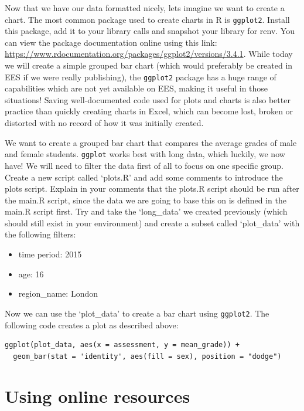 \documentclass[
  12pt,
]{article}
\providecommand{\tightlist}{%
  \setlength{\itemsep}{0pt}\setlength{\parskip}{0pt}}
\begin{document}
Now that we have our data formatted nicely, lets imagine we want to
create a chart. The most common package used to create charts in R is
\texttt{ggplot2}. Install this package, add it to your library calls and
snapshot your library for renv. You can view the package documentation
online using this link:
\url{https://www.rdocumentation.org/packages/ggplot2/versions/3.4.1}.
While today we will create a simple grouped bar chart (which would
preferably be created in EES if we were really publishing), the
\texttt{ggplot2} package has a huge range of capabilities which are not
yet available on EES, making it useful in those situations! Saving
well-documented code used for plots and charts is also better practice
than quickly creating charts in Excel, which can become lost, broken or
distorted with no record of how it was initially created.

We want to create a grouped bar chart that compares the average grades
of male and female students. \texttt{ggplot} works best with long data,
which luckily, we now have! We will need to filter the data first of all
to focus on one specific group. Create a new script called `plots.R' and
add some comments to introduce the plots script. Explain in your
comments that the plots.R script should be run after the main.R script,
since the data we are going to base this on is defined in the main.R
script first. Try and take the `long\_data' we created previously (which
should still exist in your environment) and create a subset called
`plot\_data' with the following filters:

\begin{itemize}
\tightlist
\item
  time period: 2015
\item
  age: 16
\item
  region\_name: London
\end{itemize}

Now we can use the `plot\_data' to create a bar chart using
\texttt{ggplot2}. The following code creates a plot as described above:

\begin{verbatim}
ggplot(plot_data, aes(x = assessment, y = mean_grade)) +
  geom_bar(stat = 'identity', aes(fill = sex), position = "dodge")
\end{verbatim}

\hypertarget{using-online-resources}{%
\section{Using online resources}\label{using-online-resources}}
\end{document}
